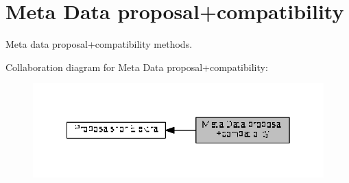 \hypertarget{group__meta}{}\section{Meta Data proposal+compatibility}
\label{group__meta}


Meta data proposal+compatibility methods.  


Collaboration diagram for Meta Data proposal+compatibility\+:
\nopagebreak
\begin{figure}[H]
\begin{center}
\leavevmode
\includegraphics[width=342pt]{group__meta}
\end{center}
\end{figure}
